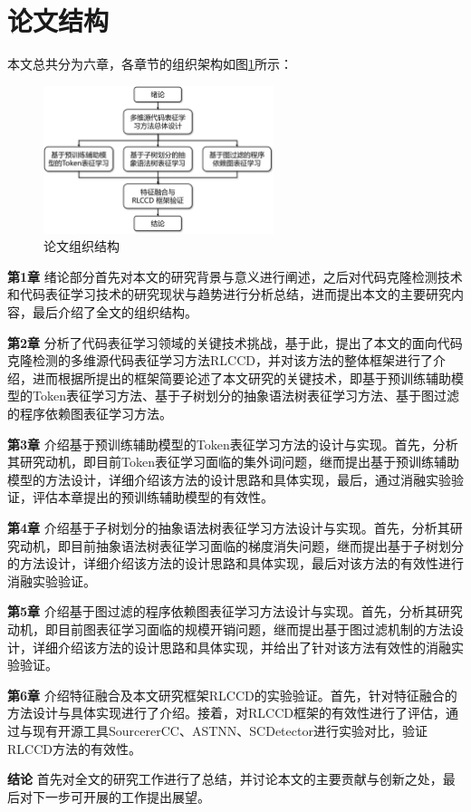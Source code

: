 \section{论文结构}
\label{sec:Summary1}
本文总共分为六章，各章节的组织架构如图\ref{fig:Structure}所示：

\begin{figure}[htp]
    \centering
    \includegraphics[width=0.6\textwidth]{figures/Structure}
    \caption{论文组织结构}\label{fig:Structure}
\end{figure}

\textbf{第1章} \quad 绪论部分首先对本文的研究背景与意义进行阐述，之后对代码克隆检测技术和代码表征学习技术的研究现状与趋势进行分析总结，进而提出本文的主要研究内容，最后介绍了全文的组织结构。

\textbf{第2章}  \quad 分析了代码表征学习领域的关键技术挑战，基于此，提出了本文的面向代码克隆检测的多维源代码表征学习方法RLCCD，并对该方法的整体框架进行了介绍，进而根据所提出的框架简要论述了本文研究的关键技术，即基于预训练辅助模型的Token表征学习方法、基于子树划分的抽象语法树表征学习方法、基于图过滤的程序依赖图表征学习方法。

\textbf{第3章}  \quad 介绍基于预训练辅助模型的Token表征学习方法的设计与实现。首先，分析其研究动机，即目前Token表征学习面临的集外词问题，继而提出基于预训练辅助模型的方法设计，详细介绍该方法的设计思路和具体实现，最后，通过消融实验验证，评估本章提出的预训练辅助模型的有效性。

\textbf{第4章}  \quad 介绍基于子树划分的抽象语法树表征学习方法设计与实现。首先，分析其研究动机，即目前抽象语法树表征学习面临的梯度消失问题，继而提出基于子树划分的方法设计，详细介绍该方法的设计思路和具体实现，最后对该方法的有效性进行消融实验验证。

\textbf{第5章}  \quad 介绍基于图过滤的程序依赖图表征学习方法设计与实现。首先，分析其研究动机，即目前图表征学习面临的规模开销问题，继而提出基于图过滤机制的方法设计，详细介绍该方法的设计思路和具体实现，并给出了针对该方法有效性的消融实验验证。

\textbf{第6章}  \quad 介绍特征融合及本文研究框架RLCCD的实验验证。首先，针对特征融合的方法设计与具体实现进行了介绍。接着，对RLCCD框架的有效性进行了评估，通过与现有开源工具SourcererCC\cite{7886988}、ASTNN\cite{8812062}、SCDetector\cite{10.1145/3324884.3416562}进行实验对比，验证RLCCD方法的有效性。

\textbf{结论}  \quad 首先对全文的研究工作进行了总结，并讨论本文的主要贡献与创新之处，最后对下一步可开展的工作提出展望。